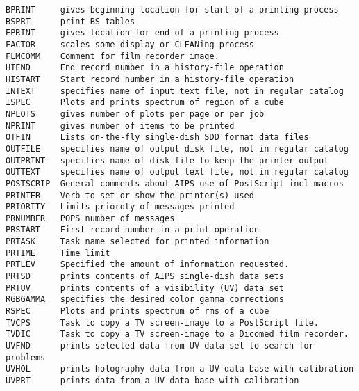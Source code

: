 
\vskip 0.5pt
\bbve\begin{verbatim}
BPRINT     gives beginning location for start of a printing process
BSPRT      print BS tables
EPRINT     gives location for end of a printing process
FACTOR     scales some display or CLEANing process
FLMCOMM    Comment for film recorder image.
HIEND      End record number in a history-file operation
HISTART    Start record number in a history-file operation
INTEXT     specifies name of input text file, not in regular catalog
ISPEC      Plots and prints spectrum of region of a cube
NPLOTS     gives number of plots per page or per job
NPRINT     gives number of items to be printed
OTFIN      Lists on-the-fly single-dish SDD format data files
OUTFILE    specifies name of output disk file, not in regular catalog
OUTPRINT   specifies name of disk file to keep the printer output
OUTTEXT    specifies name of output text file, not in regular catalog
POSTSCRIP  General comments about AIPS use of PostScript incl macros
PRINTER    Verb to set or show the printer(s) used
PRIORITY   Limits prioroty of messages printed
PRNUMBER   POPS number of messages
PRSTART    First record number in a print operation
PRTASK     Task name selected for printed information
PRTIME     Time limit
PRTLEV     Specified the amount of information requested.
PRTSD      prints contents of AIPS single-dish data sets
PRTUV      prints contents of a visibility (UV) data set
RGBGAMMA   specifies the desired color gamma corrections
RSPEC      Plots and prints spectrum of rms of a cube
TVCPS      Task to copy a TV screen-image to a PostScript file.
TVDIC      Task to copy a TV screen-image to a Dicomed film recorder.
UVFND      prints selected data from UV data set to search for problems
UVHOL      prints holography data from a UV data base with calibration
UVPRT      prints data from a UV data base with calibration
\end{verbatim}\eve


